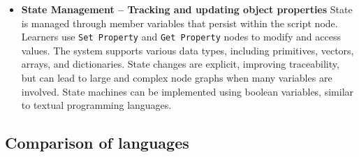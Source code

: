 \begin{itemize}
    \item \textbf{State Management – Tracking and updating object properties}
    State is managed through member variables that persist within the script node.
    Learners use \texttt{Set Property} and \texttt{Get Property} nodes to modify and access values.
    The system supports various data types, including primitives, vectors, arrays, and dictionaries.
    State changes are explicit, improving traceability, but can lead to large and complex node graphs when many variables are involved.
    State machines can be implemented using boolean variables, similar to textual programming languages.


\end{itemize}

\subsection{Comparison of languages}\label{subsec:comparison-of-languages}


